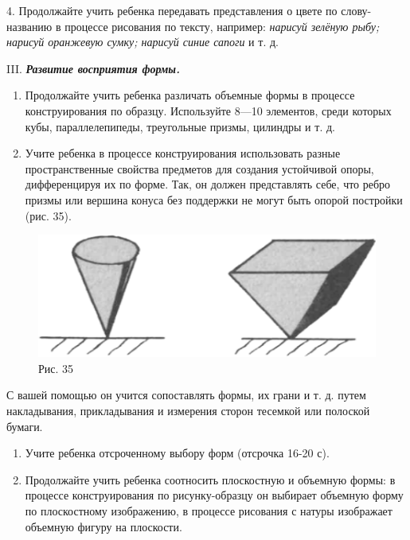 \documentclass{book}
\renewcommand{\emph}[1]{\textit{#1}}
\begin{document}
4. Продолжайте учить ребенка передавать представления о цвете по
слову-названию в процессе рисования по тексту, например: \emph{нарисуй
зелёную рыбу; нарисуй оранжевую сумку; нарисуй синие сапоги} и т. д.

III. \emph{\textbf{Развитие восприятия формы.}}


\begin{enumerate}
\def\labelenumi{\arabic{enumi}.}
\item
  
  Продолжайте учить ребенка различать объемные формы в процессе
  конструирования по образцу. Используйте 8---10 элементов, среди
  которых кубы, параллелепипеды, треугольные призмы, цилиндры и т. д.
  
\item
  
  Учите ребенка в процессе конструирования использовать разные
  пространственные свойства предметов для создания устойчивой опоры,
  дифференцируя их по форме. Так, он должен представлять себе, что ребро
  призмы или вершина конуса без поддержки не могут быть опорой постройки
  (рис. 35).
  
\end{enumerate}


\begin{figure}
\centering
\includegraphics[width=\linewidth]{media/media/image32.png}
\caption*{Рис. 35}
\end{figure}

С вашей помощью он учится сопоставлять формы, их грани и т. д. путем
накладывания, прикладывания и измерения сторон тесемкой или полоской
бумаги.


\begin{enumerate}
\def\labelenumi{\arabic{enumi}.}
\setcounter{enumi}{2}
\item
  
  Учите ребенка отсроченному выбору форм (отсрочка 16-20 с).
  
\item
  
  Продолжайте учить ребенка соотносить плоскостную и объемную формы: в
  процессе конструирования по рисунку-образцу он выбирает объемную форму
  по плоскостному изображению, в процессе рисования с натуры изображает
  объемную фигуру на плоскости.
  
\end{enumerate}
\end{document}
